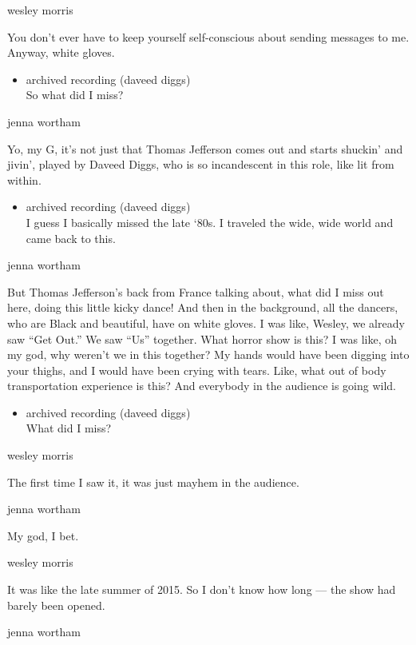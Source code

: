 wesley morris

You don't ever have to keep yourself self-conscious about sending
messages to me. Anyway, white gloves.

\begin{itemize}
\tightlist
\item
  archived recording (daveed diggs)\\
  So what did I miss?
\end{itemize}

jenna wortham

Yo, my G, it's not just that Thomas Jefferson comes out and starts
shuckin' and jivin', played by Daveed Diggs, who is so incandescent in
this role, like lit from within.

\begin{itemize}
\tightlist
\item
  archived recording (daveed diggs)\\
  I guess I basically missed the late `80s. I traveled the wide, wide
  world and came back to this.
\end{itemize}

jenna wortham

But Thomas Jefferson's back from France talking about, what did I miss
out here, doing this little kicky dance! And then in the background, all
the dancers, who are Black and beautiful, have on white gloves. I was
like, Wesley, we already saw ``Get Out.'' We saw ``Us'' together. What
horror show is this? I was like, oh my god, why weren't we in this
together? My hands would have been digging into your thighs, and I would
have been crying with tears. Like, what out of body transportation
experience is this? And everybody in the audience is going wild.

\begin{itemize}
\tightlist
\item
  archived recording (daveed diggs)\\
  What did I miss?
\end{itemize}

wesley morris

The first time I saw it, it was just mayhem in the audience.

jenna wortham

My god, I bet.

wesley morris

It was like the late summer of 2015. So I don't know how long --- the
show had barely been opened.

jenna wortham

